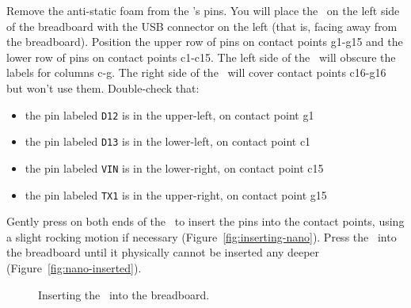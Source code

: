 Remove the anti-static foam from the \nano's pins. You will place the
\nano\ on the left side of the breadboard with the USB connector on the
left (that is, facing away from the breadboard). Position the upper row of pins
on contact points g1-g15 and the lower row of pins on contact points c1-c15.
The left side of the \nano\ will obscure the labels for columns c-g. The
right side of the \nano\ will cover contact points c16-g16 but won't use
them. Double-check that:
 \begin{itemize}
    \item the pin labeled \texttt{D12} is in the upper-left, on contact point g1
    \item the pin labeled \texttt{D13} is in the lower-left, on contact point c1
    \item the pin labeled \texttt{VIN} is in the lower-right, on contact point
        c15
    \item the pin labeled \texttt{TX1} is in the upper-right, on contact point
        g15
\end{itemize}

Gently press on both ends of the \nano\ to insert the pins into the
contact points, using a slight rocking motion if necessary
(Figure~\ref{fig:inserting-nano}). Press the \nano\ into the breadboard until it
physically cannot be inserted any deeper (Figure~\ref{fig:nano-inserted}).

\begin{figure}
    \centering
    \hfil
    \caption{Inserting the \nano\ into the breadboard.}
\end{figure}

